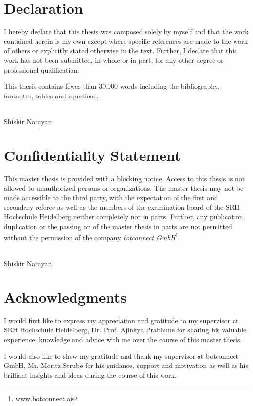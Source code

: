 \documentclass[12pt]{extarticle}
\numberwithin{equation}{section}
\begin{document}
	\setcounter{page}{1}
	\section*{Declaration}
	I hereby declare that this thesis was composed solely by myself and that the work contained herein is my own except where specific references are made to the work of others or explicitly stated otherwise in the text. Further, I declare that this work has not been submitted, in whole or in part, for any other degree or professional qualification.
	
	This thesis contains fewer than 30,000 words including the bibliography, footnotes, tables and equations.
	\\\\
	\begin{flushright}
		Shishir Narayan\\
		\date{\today}
	\end{flushright}
	\clearpage
	\section*{Confidentiality Statement}
	This master thesis is provided with a blocking notice. Access to this thesis is not allowed to unauthorized persons or organizations. The master thesis may not be made accessible to the third party, with the expectation of the first and secondary referee as well as the members of the examination board of the SRH Hochschule Heidelberg neither completely nor in parts.
	Further, any publication, duplication or the passing on of the master thesis in parts are not permitted without the permission of the company \textit{botconnect GmbH}\footnote{www.botconnect.ai}
	\\\\
	\begin{flushright}
		Shishir Narayan\\
		\date{\today}
	\end{flushright}
	\clearpage
	\section*{Acknowledgments}
	I would first like to express my appreciation and gratitude to my supervisor at SRH Hochschule Heidelberg, Dr. Prof. Ajinkya Prabhune for sharing his valuable experience, knowledge and advice with me over the course of this master thesis. 
	
	I would also like to show my gratitude and thank my supervisor at botconnect GmbH, Mr. Moritz Strube for his guidance, support and motivation as well as his brilliant insights and ideas during the course of this work.
	
\end{document}
